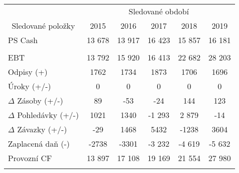 \begin{table}[!hbtp]
\centering
\begin{tabular}{|l|ccccc|}
\hline
\multicolumn{1}{|c|}{} & \multicolumn{5}{c|}{Sledované období} \\ \cline{2-6} 
\multicolumn{1}{|c|}{\multirow{-2}{*}{Sledované položky}} & \multicolumn{1}{c|}{2015} & \multicolumn{1}{c|}{2016} & \multicolumn{1}{c|}{2017} & \multicolumn{1}{c|}{2018} & 2019 \\ \hline
PS Cash & \multicolumn{1}{c|}{13 678} & \multicolumn{1}{c|}{13 917} & \multicolumn{1}{c|}{16 423} & \multicolumn{1}{c|}{15 857} & 16 181 \\ \hline
\rowcolor[HTML]{C0C0C0} 
 & \multicolumn{1}{c|}{\cellcolor[HTML]{C0C0C0}} & \multicolumn{1}{c|}{\cellcolor[HTML]{C0C0C0}} & \multicolumn{1}{c|}{\cellcolor[HTML]{C0C0C0}} & \multicolumn{1}{c|}{\cellcolor[HTML]{C0C0C0}} &  \\ \hline
EBT & \multicolumn{1}{c|}{13 792} & \multicolumn{1}{c|}{15 920} & \multicolumn{1}{c|}{16 413} & \multicolumn{1}{c|}{22 682} & 28 203 \\ \hline
Odpisy (+) & \multicolumn{1}{c|}{1762} & \multicolumn{1}{c|}{1734} & \multicolumn{1}{c|}{1873} & \multicolumn{1}{c|}{1706} & 1696 \\ \hline
Úroky (+/-) & \multicolumn{1}{c|}{0} & \multicolumn{1}{c|}{0} & \multicolumn{1}{c|}{0} & \multicolumn{1}{c|}{0} & 0 \\ \hline
$\Delta$ Zásoby (+/-) & \multicolumn{1}{c|}{89} & \multicolumn{1}{c|}{-53} & \multicolumn{1}{c|}{-24} & \multicolumn{1}{c|}{144} & 123 \\ \hline
$\Delta$ Pohledávky   (+/-) & \multicolumn{1}{c|}{1021} & \multicolumn{1}{c|}{1340} & \multicolumn{1}{c|}{-1 293} & \multicolumn{1}{c|}{2 879} & -14 \\ \hline
$\Delta$ Závazky   (+/-) & \multicolumn{1}{c|}{-29} & \multicolumn{1}{c|}{1468} & \multicolumn{1}{c|}{5432} & \multicolumn{1}{c|}{-1238} & 3604 \\ \hline
Zaplacená daň (-) & \multicolumn{1}{c|}{-2738} & \multicolumn{1}{c|}{-3301} & \multicolumn{1}{c|}{-3 232} & \multicolumn{1}{c|}{-4 619} & -5 632 \\ \hline
Provozní CF & \multicolumn{1}{c|}{13 897} & \multicolumn{1}{c|}{17 108} & \multicolumn{1}{c|}{19 169} & \multicolumn{1}{c|}{21 554} & 27 980 \\ \hline
\rowcolor[HTML]{C0C0C0} 
 & \multicolumn{1}{c|}{\cellcolor[HTML]{C0C0C0}} & \multicolumn{1}{c|}{\cellcolor[HTML]{C0C0C0}} & \multicolumn{1}{c|}{\cellcolor[HTML]{C0C0C0}} & \multicolumn{1}{c|}{\cellcolor[HTML]{C0C0C0}} &  \\ \hline

\end{tabular}
\end{table}
